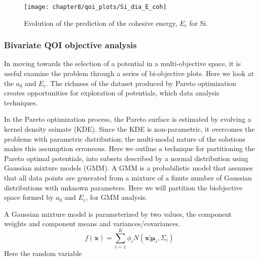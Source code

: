 \begin{figure}
	\centering
	\captionsetup{justification=centering,margin=1in}
	\texttt{[image: chapter8/qoi\_plots/Si\_dia\_E\_coh]}
	\caption{Evolution of the prediction of the cohesive energy, $E_c$ for Si.}
	\label{fig:Si_qoi_E_coh}
\end{figure}
\subsubsection{Bivariate QOI objective analysis}
In moving towards the selection of a potential in a multi-objective space, it is useful examine the problem through a series of bi-objective plots.  Here we look at the $a_0$ and $E_c$.  The richness of the dataset produced by Pareto optimization creates opportunities for exploration of potentials, which data analysis techniques.

In the Pareto optimization process, the Pareto surface is estimated by evolving a kernel density esimate (KDE).  Since the KDE is non-parametric, it overcomes the problems with parametric distribution; the multi-modal nature of the solutions makes this assumption erroneous.  Here we outline a technique for partitioning the Pareto optimal potentials, into subsets described by a normal distribution using Gaussian mixture models (GMM).  A GMM is a probabilistic model that assumes that all data points are generated from a mixture of a finute number of Gaussian distributions with unknown parameters.  Here we will partition the biobjective space formed by $a_0$ and $E_c$, for GMM analysis.

A Gaussian mixture model is parameterized by two values, the component weights and component means and variances/covariances.
\begin{equation}
\label{eq:gmm}
    f(\bm{x}) = \sum_{i=1}^K \phi_i N(\bm{x}|\bm{\mu}_i,\Sigma_i)
\end{equation}
Here the random variable

